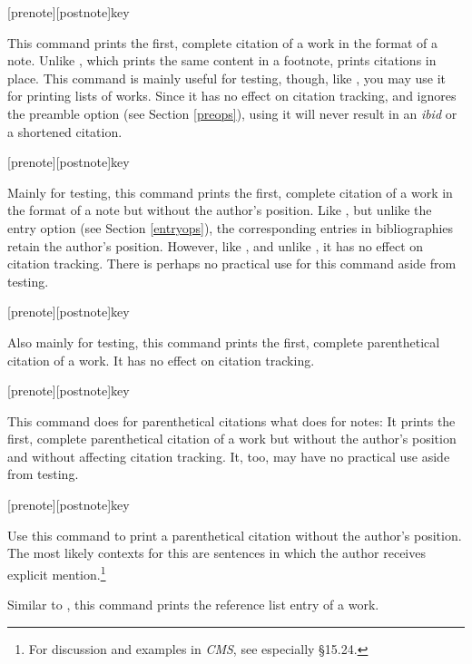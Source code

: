 \documentclass[11pt,letterpaper,oneside]{article}
\begin{document}
\begin{ltxsyntax}
[prenote][postnote]{key}

This command prints the first, complete citation of a work in the
format of a note. Unlike , which prints the same
content in a footnote,  prints citations in place. This
command is mainly useful for testing, though, like , you
may use it for printing lists of works. Since it has no effect on
citation tracking, and ignores the preamble option
 (see Section \ref{preops}), using it will never
result in an \textit{ibid} or a shortened citation.

[prenote][postnote]{key}

Mainly for testing, this command prints the first, complete citation
of a work in the format of a note but without the author's position.
Like , but unlike the entry option  (see
Section \ref{entryops}), the corresponding entries in bibliographies
retain the author's position. However, like , and unlike
, it has no effect on citation tracking. There is perhaps
no practical use for this command aside from testing.


[prenote][postnote]{key}

Also mainly for testing, this command prints the first, complete
parenthetical citation of a work. It has no effect on citation
tracking.

[prenote][postnote]{key}

This command does for parenthetical citations what 
does for notes: It prints the first, complete parenthetical citation
of a work but without the author's position and without affecting
citation tracking. It, too, may have no practical use aside from
testing.

[prenote][postnote]{key}

Use this command to print a parenthetical citation without the
author's position. The most likely contexts for this are sentences in
which the author receives explicit mention.\footnote{For discussion
and examples in \textit{CMS}, see especially \S15.24.}


Similar to , this command prints the reference list
entry of a work.



\end{ltxsyntax}
\end{document}

